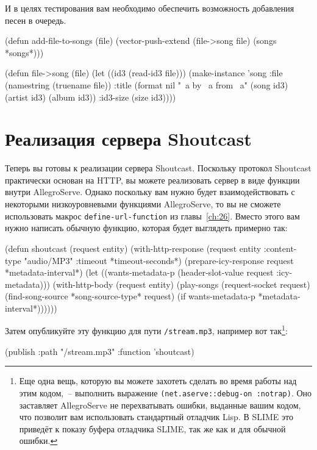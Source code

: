 И в целях тестирования вам необходимо обеспечить возможность добавления песен в очередь.

\begin{myverb}
(defun add-file-to-songs (file)
  (vector-push-extend (file->song file) (songs *songs*)))

(defun file->song (file)
  (let ((id3 (read-id3 file)))
    (make-instance 
     'song
     :file (namestring (truename file))
     :title (format nil "~a by ~a from ~a" (song id3) (artist id3) (album id3))
     :id3-size (size id3))))
\end{myverb}

\section{Реализация сервера Shoutcast}

Теперь вы готовы к реализации сервера Shoutcast. Поскольку протокол Shoutcast практически
основан на HTTP, вы можете реализовать сервер в виде функции внутри AllegroServe.  Однако
поскольку вам нужно будет взаимодействовать с некоторыми низкоуровневыми функциями
AllegroServe, то вы не сможете использовать макрос \lstinline{define-url-function} из
главы~\ref{ch:26}. Вместо этого вам нужно написать обычную функцию, которая будет
выглядеть примерно так:

\begin{myverb}
(defun shoutcast (request entity)
  (with-http-response
      (request entity :content-type "audio/MP3" :timeout *timeout-seconds*)
    (prepare-icy-response request *metadata-interval*)
    (let ((wants-metadata-p (header-slot-value request :icy-metadata)))
      (with-http-body (request entity)
        (play-songs 
         (request-socket request)
         (find-song-source *song-source-type* request)
         (if wants-metadata-p *metadata-interval*))))))
\end{myverb}

Затем опубликуйте эту функцию для пути \lstinline{/stream.mp3}, например вот так\footnote{Еще
  одна вещь, которую вы можете захотеть сделать во время работы над этим кодом,~--
  выполнить выражение \lstinline{(net.aserve::debug-on :notrap)}.  Оно заставляет AllegroServe
  не перехватывать ошибки, выданные вашим кодом, что позволит вам использовать стандартный
  отладчик Lisp.  В SLIME это приведёт к показу буфера отладчика SLIME, так же как и для
  обычной ошибки.}:

\begin{myverb}
(publish :path "/stream.mp3" :function 'shoutcast)
\end{myverb}

